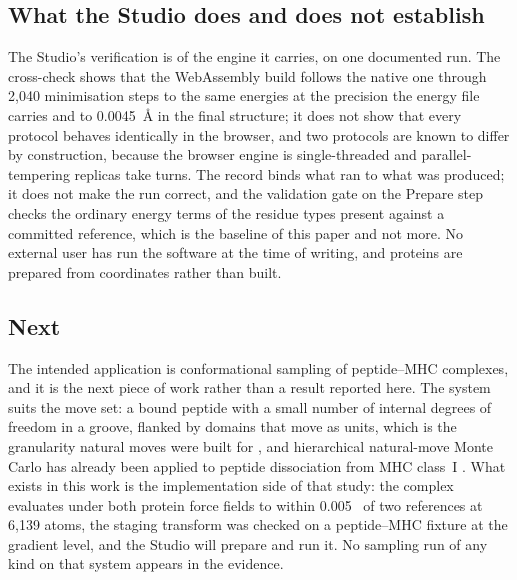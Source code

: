 \subsection{What the Studio does and does not establish}
\label{sec:studio-limits}

The Studio's verification is of the engine it carries, on one documented run.
The cross-check shows that the WebAssembly build follows the native one through
2,040 minimisation steps to the same energies at the precision the energy file
carries and to 0.0045~\AA{} in the final structure; it does not show that every
protocol behaves identically in the browser, and two protocols are known to
differ by construction, because the browser engine is single-threaded and
parallel-tempering replicas take turns. The record binds what ran to what was
produced; it does not make the run correct, and the validation gate on the
Prepare step checks the ordinary energy terms of the residue types present
against a committed reference, which is the baseline of this paper and not
more. No external user has run the software at the time of writing, and
proteins are prepared from coordinates rather than built.

\subsection{Next}
\label{sec:next}

The intended application is conformational sampling of peptide--MHC complexes,
and it is the next piece of work rather than a result reported here. The system
suits the move set: a bound peptide with a small number of internal degrees of
freedom in a groove, flanked by domains that move as units, which is the
granularity natural moves were built for \cite{sim2012naturalmoves}, and
hierarchical natural-move Monte Carlo has already been applied to peptide
dissociation from MHC class~I \cite{knapp2016pmhc}. What exists in this work is
the implementation side of that study: the complex evaluates under both
protein force fields to within 0.005~\kcal{} of two references at 6,139 atoms,
the staging transform was checked on a peptide--MHC fixture at the gradient
level, and the Studio will prepare and run it. No sampling run of any kind on
that system appears in the evidence.

